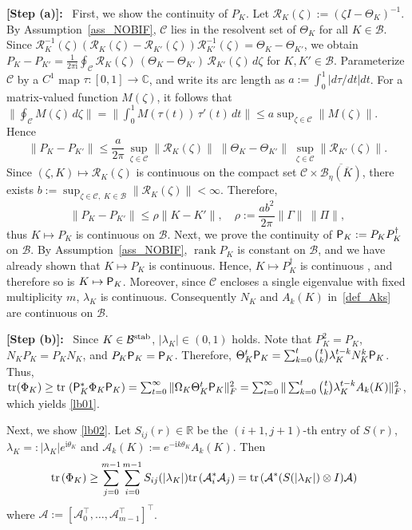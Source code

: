 \documentclass[preprint,5p,times,twocolumn]{elsarticle}
\def\tr{{\rm tr} \hspace{0.5mm}}
\def\HH{\hspace{-2.0mm}}
\begin{document}
 {\bf [Step (a)]:}~ First, we show the continuity of $P_K$. Let $\mathcal R_K(\zeta):=(\zeta I-\Theta_K)^{-1}$. 
By Assumption~\ref{ass_NOBIF}, $\mathcal C$ lies in the resolvent set of $\Theta_K$ for all $K \in \mathcal B$. Since $\mathcal R_K^{-1}(\zeta)(\mathcal R_K(\zeta) - \mathcal R_{K'}(\zeta))\mathcal R_{K'}^{-1}(\zeta) = \Theta_K-\Theta_{K'}$, we obtain $P_K-P_{K'} =\frac{1}{2\pi {\mathrm i}}\oint_{\mathcal C}\mathcal R_K(\zeta)\,(\Theta_K-\Theta_{K'})\,\mathcal R_{K'}(\zeta)\,d\zeta$ for $K,K'\in\mathcal B$. 
Parameterize $\mathcal C$ by a $C^1$ map $\tau:[0,1]\to\mathbb C$, and write its arc length as
$a:=\int_0^1|d\tau/dt|dt$. For a matrix-valued function $M(\zeta)$, it follows that $\|\oint_{\mathcal C}M(\zeta)\,d\zeta\|
=\|\int_0^1 M(\tau(t))\,\tau'(t)\,dt\|
\leq a\sup_{\zeta\in\mathcal C}\|M(\zeta)\|$. Hence
\[
\|P_K-P_{K'}\|
\le \frac{a}{2\pi}\,
\sup_{\zeta\in\mathcal C}\|\mathcal R_K(\zeta)\|\;
\|\Theta_K-\Theta_{K'}\|\;
\sup_{\zeta\in\mathcal C}\|\mathcal R_{K'}(\zeta)\|.
\]
Since $(\zeta,K)\mapsto \mathcal R_K(\zeta)$ is continuous on the compact set
$\mathcal C\times\overline{\mathcal B_\eta(\overline K)}$, there exists $b:=\sup_{\zeta\in\mathcal C,\;K\in\mathcal B}\|\mathcal R_K(\zeta)\|<\infty$. 
Therefore,
\[
\|P_K-P_{K'}\| \le \rho \|K - K'\|, \quad \rho := \frac{ab^2}{2\pi}\|\Gamma\|~\|\Pi\|, 
\]
thus $K\mapsto P_K$ is continuous on $\mathcal B$. 
Next, we prove the continuity of ${\sf P}_K:=P_K P_K^{\dagger}$ on $\mathcal B$.
By Assumption~\ref{ass_NOBIF}, $\operatorname{rank} P_K$ is constant on $\mathcal B$, and we have already shown that $K\mapsto P_K$ is continuous.
Hence, $K\mapsto P_K^{\dagger}$ is continuous \cite{xu2020perturbation}, and therefore so is $K\mapsto{\sf P}_K$. Moreover, since $\mathcal C$ encloses a single eigenvalue with fixed multiplicity $m$, $\lambda_K$ is continuous. Consequently $N_K$ and $A_k(K)$ in~\eqref{def_Aks} are continuous on $\mathcal B$. 

 {\bf [Step (b)]:}~ Since $K \in \mathcal B^{\rm stab}$, $|\lambda_K| \in (0,1)$ holds. Note that $P_K^2 = P_K$, $N_KP_K = P_KN_K$, and $P_K {\sf P}_K = {\sf P}_K$. Therefore,  
 $\Theta_K^t {\sf P}_K = \sum_{k=0}^t \binom{t}{k}\lambda_K^{t-k}N_K^{k}{\sf P}_K$. Thus, ${\rm tr}(\Phi_K) \geq \tr \left({\sf P}_K^{*}\Phi_K {\sf P}_K\right) = \sum_{t=0}^{\infty}\|\Omega_K\Theta_K^t {\sf P}_K\|_F^2 = \sum_{t=0}^{\infty} \|\sum_{k=0}^{t}\binom{t}{k} \lambda_K^{t-k} A_k(K)\|_F^2$, which yields \eqref{lb01}. 
 
 Next, we show \eqref{lb02}. Let $S_{ij}(r) \in \mathbb R$ be the $(i+1, j+1)$-th entry of $S(r)$, $\lambda_K =: |\lambda_K|e^{{\mathrm i}\theta_K}$ and $\mathcal A_k(K) := e^{-{\mathrm i}k\theta_K}A_k(K)$. Then
 \begin{align}
     \HH {\tr }(\Phi_K) \geq \sum_{j=0}^{m-1}\sum_{i=0}^{m-1} S_{ij}(|\lambda_K|)\tr(\mathcal A_i^*\mathcal A_j) = \tr (\mathcal A^*(S(|\lambda_K|)\otimes I)\mathcal A) \label{tttt}
 \end{align}
 where $\mathcal A := [\mathcal A_0^{\top}, \dots, \mathcal A_{m-1}^{\top}]^{\top}$. 
 
\end{document}

